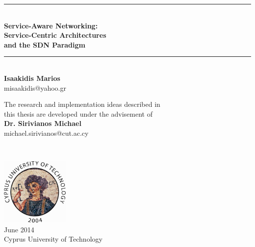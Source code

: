 \begin{titlepage}

\begin{center}

\newcommand{\HRule}{\rule{\linewidth}{0.5mm}}



\HRule \\[0.5cm]
{ \LARGE \bfseries {\huge Service-Aware Networking:} \\[0.2cm] Service-Centric Architectures\\[0.2cm]and the SDN Paradigm}\\[0.5cm]

\HRule \\[1cm]

{\LARGE \bf
Isaakidis Marios\\
}
misaakidis@yahoo.gr

\vfill

{\large
The research and implementation ideas described in\\ this thesis are developed under the advisement of\\ \textbf{Dr. Sirivianos Michael}\\}
michael.sirivianos@cut.ac.cy
\end{center}
 ~\\[2.1cm]
\begin{flushright}
\includegraphics[width=0.25\textwidth]{./cut-logo-2}\\[0.2cm]
{\large
June 2014 \\
Cyprus University of Technology
}
\end{flushright}

\end{titlepage}
